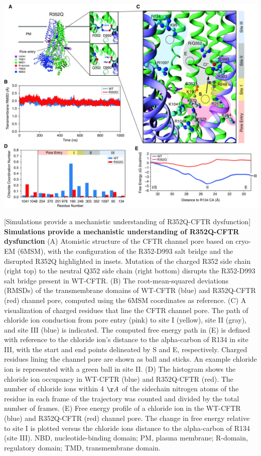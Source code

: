 \begin{center}
	\includegraphics[width=\textwidth]{figures/R352Q/figure_4.jpg}
\end{center}
\begingroup
{}[Simulations provide a mechanistic understanding of R352Q-CFTR dysfunction] {\textbf{Simulations provide a mechanistic understanding of R352Q-CFTR dysfunction}}{ (A) Atomistic structure of the CFTR channel pore based on cryo-EM (6MSM), with the configuration of the R352-D993 salt bridge and the disrupted R352Q highlighted in insets. Mutation of the charged R352 side chain (right top) to the neutral Q352 side chain (right bottom) disrupts the R352-D993 salt bridge present in WT-CFTR. (B) The root-mean-squared deviations (RMSDs) of the transmembrane domains of WT-CFTR (blue) and R352Q-CFTR (red) channel pore, computed using the 6MSM coordinates as reference. (C) A visualization of charged residues that line the CFTR channel pore. The path of chloride ion conduction from pore entry (pink) to site I (yellow), site II (gray), and site III (blue) is indicated. The computed free energy path in (E) is defined with reference to the chloride ion’s distance to the alpha-carbon of R134 in site III, with the start and end points delineated by S and E, respectively. Charged residues lining the channel pore are shown as ball and sticks. An example chloride ion is represented with a green ball in site II. (D) The histogram shows the chloride ion occupancy in WT-CFTR (blue) and R352Q-CFTR (red). The number of chloride ions within 4 $\AA$ of the sidechain nitrogen atoms of the residue in each frame of the trajectory was counted and divided by the total number of frames. (E) Free energy profile of a chloride ion in the WT-CFTR (blue) and R352Q-CFTR (red) channel pore. The change in free energy relative to site I is plotted versus the chloride ions distance to the alpha-carbon of R134 (site III). NBD, nucleotide-binding domain; PM, plasma membrane; R-domain, regulatory domain; TMD, transmembrane domain.}
\label{R352Q_figure_4}
\endgroup

